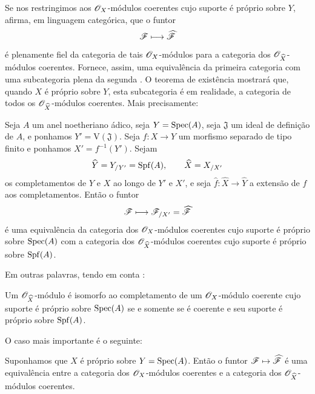 Se nos restringimos aos $\mathscr{O}_X$-módulos coerentes cujo
suporte é próprio sobre $Y$,  afirma, em linguagem
categórica, que o funtor
\[
  \mathscr{F}\longmapsto\widehat{\mathscr{F}}
\]
é plenamente fiel da categoria de tais $\mathscr{O}_X$-módulos para
a categoria dos $\mathscr{O}_{\widehat{X}}$-módulos coerentes. Fornece, assim,
uma equivalência da primeira categoria com uma subcategoria plena
da segunda . O teorema de existência
mostrará que, quando $X$ é próprio sobre $Y$, esta subcategoria é em
realidade, a categoria de todos os
$\mathscr{O}_{\widehat{X}}$-módulos coerentes. Mais precisamente:

\begin{theorem}[5.1.4]
\label{III.5.1.4}
Seja $A$ um anel noetheriano ádico, seja $Y=\operatorname{Spec}(A)$, seja
$\mathfrak{J}$ um ideal de definição de $A$, e ponhamos
$Y'=\mathrm{V}(\mathfrak{J})$. Seja $f:X\to Y$ um morfismo separado
de tipo finito e ponhamos $X'=f^{-1}(Y')$. Sejam
\[
  \widehat{Y}=Y_{/Y'}=\operatorname{Spf}(A),\qquad
  \widehat{X}=X_{/X'}
\]
os completamentos de $Y$ e $X$ ao longo de $Y'$ e $X'$, e seja
$\widehat{f}:\widehat{X}\to\widehat{Y}$ a extensão de $f$ aos
completamentos. Então o funtor
\[
  \mathscr{F}\longmapsto\mathscr{F}_{/X'}=\widehat{\mathscr{F}}
\]
é uma equivalência da categoria dos
$\mathscr{O}_X$-módulos coerentes cujo suporte é próprio sobre $\operatorname{Spec}(A)$ com a
categoria dos $\mathscr{O}_{\widehat{X}}$-módulos coerentes cujo suporte
é próprio sobre $\operatorname{Spf}(A)$.
\end{theorem}

Em outras palavras, tendo em conta :

\begin{corollary}[5.1.5]
\label{III.5.1.5}
Um $\mathscr{O}_{\widehat{X}}$-módulo é isomorfo ao completamento de
um $\mathscr{O}_X$-módulo coerente cujo suporte é próprio sobre
$\operatorname{Spec}(A)$ se e somente se é coerente e seu suporte é próprio
sobre $\operatorname{Spf}(A)$.
\end{corollary}

O caso mais importante é o seguinte:

\begin{corollary}[5.1.6]
\label{III.5.1.6}
Suponhamos que $X$ é próprio sobre $Y=\operatorname{Spec}(A)$. Então o funtor
$\sh{F}\mapsto\widehat{\sh{F}}$ é uma equivalência entre a
categoria dos $\mathscr{O}_X$-módulos coerentes e a categoria dos
$\mathscr{O}_{\widehat{X}}$-módulos coerentes.
\end{corollary}

